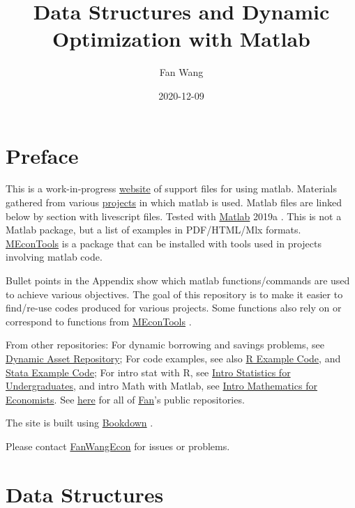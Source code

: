\documentclass[
]{book}
\title{Data Structures and Dynamic Optimization with Matlab}
\author{Fan Wang}
\date{2020-12-09}
\begin{document}
\maketitle

{
\hypersetup{linkcolor=}
\setcounter{tocdepth}{2}
\tableofcontents
}
\hypertarget{preface}{%
\chapter*{Preface}\label{preface}}

This is a work-in-progress \href{https://fanwangecon.github.io/M4Econ/}{website} of support files for using matlab. Materials gathered from various \href{https://fanwangecon.github.io/research}{projects} in which matlab is used. Matlab files are linked below by section with livescript files. Tested with \href{https://www.mathworks.com/products/matlab.html}{Matlab} 2019a \citep{matlab}. This is not a Matlab package, but a list of examples in PDF/HTML/Mlx formats. \href{https://github.com/FanWangEcon/MEconTools}{MEconTools} is a package that can be installed with tools used in projects involving matlab code.

Bullet points in the Appendix show which matlab functions/commands are used to achieve various objectives. The goal of this repository is to make it easier to find/re-use codes produced for various projects. Some functions also rely on or correspond to functions from \href{https://github.com/FanWangEcon/MEconTools}{MEconTools} \citep{M-MEconTools}.

From other repositories: For dynamic borrowing and savings problems, see \href{https://fanwangecon.github.io/CodeDynaAsset/}{Dynamic Asset Repository}; For code examples, see also \href{https://fanwangecon.github.io/R4Econ/}{R Example Code}, and \href{https://fanwangecon.github.io/Stata4Econ/}{Stata Example Code}; For intro stat with R, see \href{https://fanwangecon.github.io/Stat4Econ/}{Intro Statistics for Undergraduates}, and intro Math with Matlab, see \href{https://fanwangecon.github.io/Math4Econ/}{Intro Mathematics for Economists}. See \href{https://github.com/FanWangEcon}{here} for all of \href{https://fanwangecon.github.io/}{Fan}'s public repositories.

The site is built using \href{https://bookdown.org/}{Bookdown} \citep{R-bookdown}.

Please contact \href{https://fanwangecon.github.io/}{FanWangEcon} for issues or problems.

\hypertarget{data-structures}{%
\chapter{Data Structures}\label{data-structures}}
\end{document}
